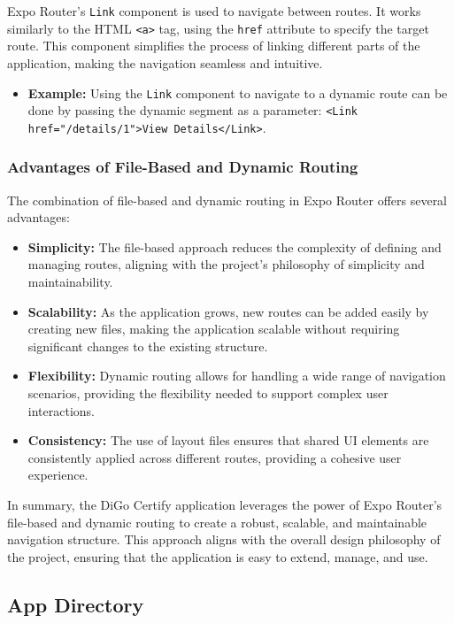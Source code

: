 Expo Router's \texttt{Link} component is used to navigate between routes. It works similarly to the HTML \texttt{<a>} tag, using the \texttt{href} attribute to specify the target route. This component simplifies the process of linking different parts of the application, making the navigation seamless and intuitive.

\begin{itemize}
    \item \textbf{Example:} Using the \texttt{Link} component to navigate to a dynamic route can be done by passing the dynamic segment as a parameter: \texttt{<Link href="/details/1">View Details</Link>}.
\end{itemize}

\subsubsection{Advantages of File-Based and Dynamic Routing}

The combination of file-based and dynamic routing in Expo Router offers several advantages:

\begin{itemize}
    \item \textbf{Simplicity:} The file-based approach reduces the complexity of defining and managing routes, aligning with the project's philosophy of simplicity and maintainability.
    \item \textbf{Scalability:} As the application grows, new routes can be added easily by creating new files, making the application scalable without requiring significant changes to the existing structure.
    \item \textbf{Flexibility:} Dynamic routing allows for handling a wide range of navigation scenarios, providing the flexibility needed to support complex user interactions.
    \item \textbf{Consistency:} The use of layout files ensures that shared UI elements are consistently applied across different routes, providing a cohesive user experience.
\end{itemize}

In summary, the DiGo Certify application leverages the power of Expo Router's file-based and dynamic routing to create a robust, scalable, and maintainable navigation structure. This approach aligns with the overall design philosophy of the project, ensuring that the application is easy to extend, manage, and use.

\subsection{App Directory}

